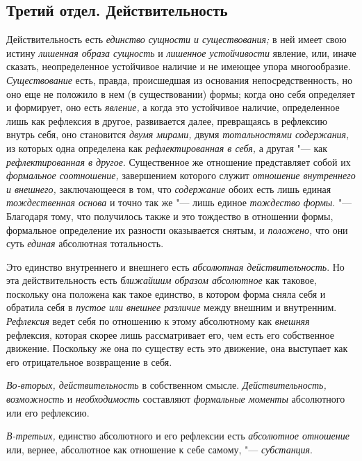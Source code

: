\subsection[{\em Третий отдел.} ДЕЙСТВИТЕЛЬНОСТЬ]
{Третий отдел. Действительность}

Действительность есть {\em единство сущности и существования;} в ней имеет
свою истину {\em лишенная образа сущность} и
{\em лишенное устойчивости} явление, или, иначе
сказать, неопределенное устойчивое наличие и не имеющее упора многообразие.
{\em Существование} есть, правда, происшедшая из
основания непосредственность, но оно еще не положило в нем (в
существовании) формы; когда оно себя определяет и формирует, оно есть
{\em явление,} а когда это устойчивое наличие,
определенное лишь как рефлексия в другое, развивается далее, превращаясь в
рефлексию внутрь себя, оно становится {\em двумя
мирами,} двумя {\em тотальностями содержания,} из
которых одна определена как {\em рефлектированная в
себя,} а другая "--- как {\em рефлектированная в другое}.
Существенное же отношение представляет собой их
{\em формальное соотношение,} завершением которого
служит {\em отношение внутреннего и внешнего,}
заключающееся в том, что {\em содержание} обоих есть
лишь единая {\em тождественная основа} и точно так же
"--- лишь единое {\em тождество формы}. "--- Благодаря тому,
что получилось также и это тождество в отношении формы, формальное
определение их разности оказывается снятым, и
{\em положено,} что они суть {\em единая} абсолютная тотальность.

Это единство внутреннего и внешнего есть {\em абсолютная
действительность}. Но эта действительность есть
{\em ближайшим образом абсолютное} как таковое,
поскольку она положена как такое единство, в котором форма сняла себя и
обратила себя в {\em пустое или внешнее различие} между
внешним и внутренним. {\em Рефлексия} ведет себя по
отношению к этому абсолютному как {\em внешняя}
рефлексия, которая скорее лишь рассматривает его, чем есть его собственное
движение. Поскольку же она по существу есть это движение, она выступает как
его отрицательное возвращение в себя.

{\em Во-вторых, действительность} в собственном смысле.
{\em Действительность, возможность} и {\em необходимость} составляют
{\em формальные моменты} абсолютного или его рефлексию.

{\em В-третьих,} единство абсолютного и его рефлексии
есть {\em абсолютное отношение} или, вернее, абсолютное
как отношение к себе самому, "--- {\em субстанция}.

